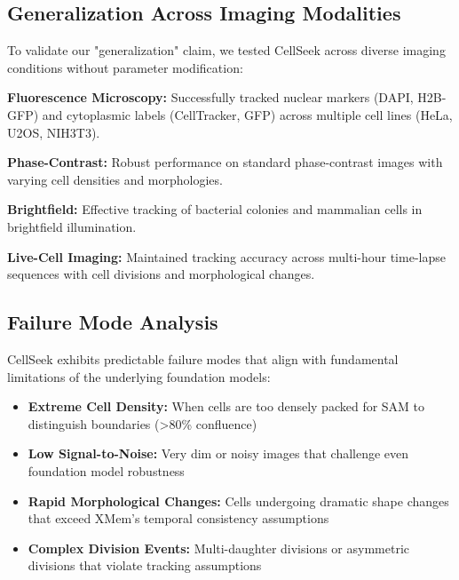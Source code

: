 \documentclass[12pt]{article}
\begin{document}
\subsection{Generalization Across Imaging Modalities}


To validate our "generalization" claim, we tested CellSeek across diverse imaging conditions without parameter modification:

\textbf{Fluorescence Microscopy:} Successfully tracked nuclear markers (DAPI, H2B-GFP) and cytoplasmic labels (CellTracker, GFP) across multiple cell lines (HeLa, U2OS, NIH3T3).

\textbf{Phase-Contrast:} Robust performance on standard phase-contrast images with varying cell densities and morphologies.

\textbf{Brightfield:} Effective tracking of bacterial colonies and mammalian cells in brightfield illumination.

\textbf{Live-Cell Imaging:} Maintained tracking accuracy across multi-hour time-lapse sequences with cell divisions and morphological changes.

\subsection{Failure Mode Analysis}


CellSeek exhibits predictable failure modes that align with fundamental limitations of the underlying foundation models:

\begin{itemize}
\item \textbf{Extreme Cell Density:} When cells are too densely packed for SAM to distinguish boundaries (>80\% confluence)
\item \textbf{Low Signal-to-Noise:} Very dim or noisy images that challenge even foundation model robustness
\item \textbf{Rapid Morphological Changes:} Cells undergoing dramatic shape changes that exceed XMem's temporal consistency assumptions
\item \textbf{Complex Division Events:} Multi-daughter divisions or asymmetric divisions that violate tracking assumptions
\end{itemize}
\end{document}
